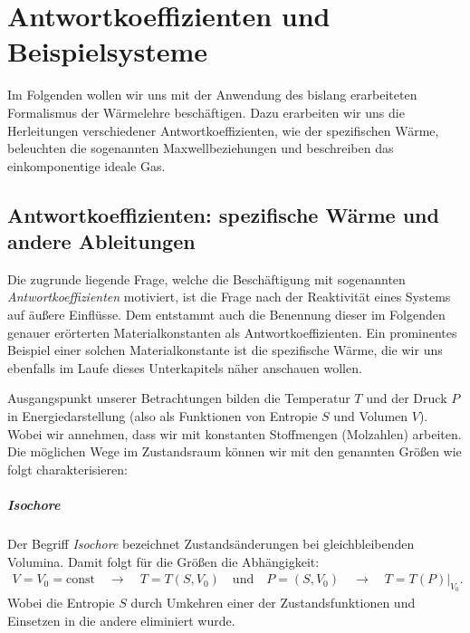 \chapter{Antwortkoeffizienten und Beispielsysteme}
Im Folgenden wollen wir uns mit der Anwendung des bislang erarbeiteten Formalismus der Wärmelehre beschäftigen. Dazu erarbeiten wir uns die Herleitungen verschiedener Antwortkoeffizienten, wie der spezifischen Wärme, beleuchten die sogenannten Maxwellbeziehungen und beschreiben das einkomponentige ideale Gas.
\section{Antwortkoeffizienten: spezifische Wärme und andere Ableitungen}
Die zugrunde liegende Frage, welche die Beschäftigung mit sogenannten \emph{Antwortkoeffizienten} motiviert, ist die Frage nach der Reaktivität eines Systems auf äußere Einflüsse. Dem entstammt auch die Benennung dieser \textendash{} im Folgenden genauer erörterten \textendash{} Materialkonstanten als Antwortkoeffizienten.
Ein prominentes Beispiel einer solchen Materialkonstante ist die spezifische Wärme, die wir uns ebenfalls im Laufe dieses Unterkapitels näher anschauen wollen.


Ausgangspunkt unserer Betrachtungen bilden die Temperatur $T$ und der Druck $P$ in Energiedarstellung (also als Funktionen von Entropie $S$ und Volumen $V$). Wobei wir annehmen, dass wir mit konstanten Stoffmengen (Molzahlen) arbeiten.  Die möglichen Wege im Zustandsraum können wir mit den genannten Größen wie folgt charakterisieren:


\paragraph*{Isochore}
Der Begriff \emph{Isochore} bezeichnet Zustandsänderungen bei gleichbleibenden Volumina. Damit folgt für die Größen die Abhängigkeit:
\begin{align*}
    V=V_0=\mathrm{const}\quad\rightarrow\quad T=T(S,V_0) \quad\text{und}\quad P=(S,V_0) \quad\rightarrow\quad T=T(P)|_{V_0}.
\end{align*}
Wobei die Entropie $S$ durch Umkehren einer der Zustandsfunktionen und Einsetzen in die andere eliminiert wurde.


